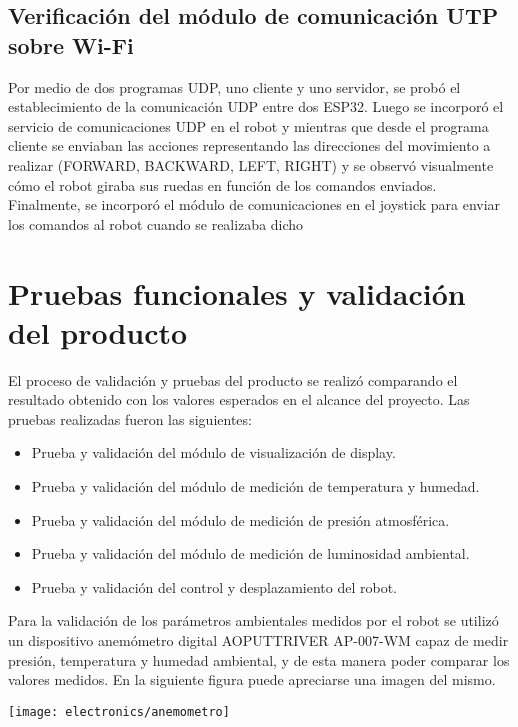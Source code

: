 \subsection{Verificación del módulo de comunicación UTP sobre Wi-Fi}
Por medio de dos programas UDP, uno cliente y uno servidor, se probó el establecimiento de la comunicación UDP entre dos ESP32. Luego se incorporó el servicio de comunicaciones UDP en el robot y mientras que desde el programa cliente se enviaban las acciones representando las direcciones del movimiento a realizar (FORWARD, BACKWARD, LEFT, RIGHT) y se observó visualmente cómo el robot giraba sus ruedas en función de los comandos enviados. Finalmente, se incorporó el módulo de comunicaciones en el joystick para enviar los comandos al robot cuando se realizaba dicho


\section{Pruebas funcionales y validación del producto}

El proceso de validación y pruebas del producto se realizó comparando el resultado obtenido con los valores esperados en el alcance del proyecto. Las pruebas realizadas fueron las siguientes:
\begin{itemize}
	\item Prueba y validación del módulo de visualización de display.
	\item Prueba y validación del módulo de medición de temperatura y humedad.
	\item Prueba y validación del módulo de medición de presión atmosférica.
	\item Prueba y validación del módulo de medición de luminosidad ambiental.
	\item Prueba y validación del control y desplazamiento del robot.
\end{itemize}

Para la validación de los parámetros ambientales medidos por el robot se utilizó un dispositivo anemómetro digital AOPUTTRIVER AP-007-WM capaz de medir presión, temperatura y humedad ambiental, y de esta manera poder comparar los valores medidos. En la siguiente figura puede apreciarse una imagen del mismo.

\begin{center}
\texttt{[image: electronics/anemometro]}
  \label{fig:anemometro}
\end{center}


